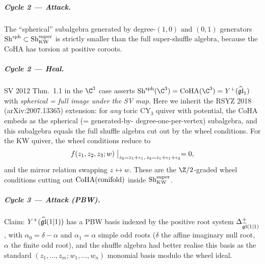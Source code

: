 \subparagraph{Cycle 2 --- Attack.} The ``spherical'' subalgebra
generated by degree-$(1,0)$ and $(0,1)$ generators $\mathrm{Sh}^{\mathrm{sph}}
\subset \mathrm{Sh}^{\mathrm{super}}_{\mathrm{KW}}$ is strictly smaller than the
full super-shuffle algebra, because the CoHA has torsion at positive
coroots.

\subparagraph{Cycle 2 --- Heal.} SV 2012 Thm.~1.1 in the $\C^3$ case
asserts $\Sh^{\mathrm{sph}}(\C^3) = \CoHA(\C^3) = Y^+(\widehat{\fgl}_1)$
with \emph{spherical = full image under the SV map}. Here we inherit the
RSYZ 2018 (arXiv:2007.13365) extension: for \emph{any} toric CY$_3$
quiver with potential, the CoHA embeds as the spherical (= generated-by-
degree-one-per-vertex) subalgebra, and this subalgebra equals the full
shuffle algebra cut out by the wheel conditions. For the KW quiver, the
wheel conditions reduce to
\[
  f(z_1,z_2,z_3; w)\bigm|_{z_2=z_1+\epsilon_1,\,z_3=z_1+\epsilon_1+
  \epsilon_2} = 0,
\]
and the mirror relation swapping $z\leftrightarrow w$. These are the
$\Z/2$-graded wheel conditions cutting out $\mathrm{CoHA}(\mathrm{conifold})$
inside $\mathrm{Sh}^{\mathrm{super}}_{\mathrm{KW}}$.

\subparagraph{Cycle 3 --- Attack (PBW).} Claim: $Y^+(\widehat{\mathfrak{gl}}(1|1))$
has a PBW basis indexed by the positive root system $\Delta^+_{\widehat{
\mathfrak{gl}}(1|1)}$, with $\alpha_0=\delta-\alpha$ and $\alpha_1=\alpha$ simple
odd roots ($\delta$ the affine imaginary null root, $\alpha$ the
finite odd root), and the shuffle algebra had better realise this basis
as the standard $(z_1,\dots,z_m;w_1,\dots,w_n)$ monomial basis modulo
the wheel ideal.

